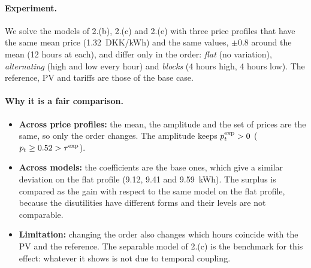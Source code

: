 \paragraph{Experiment.} We solve the models of 2.(b), 2.(c) and 2.(e) with three price profiles that have the same mean price (1.32~DKK/kWh) and the same values, $\pm 0.8$ around the
mean (12 hours at each), and differ only in the order: \emph{flat} (no variation), \emph{alternating} (high and low every hour) and \emph{blocks} (4 hours high, 4 hours low). The
reference, PV and tariffs are those of the base case.

\paragraph{Why it is a fair comparison.}
\begin{itemize}
    \item \textbf{Across price profiles:} the mean, the amplitude and the set of prices are the same, so only the order changes. The amplitude keeps $p^{\mathrm{exp}}_{t} > 0$ ($p_t \geq 0.52 > \tau^{\mathrm{exp}}$).
    \item \textbf{Across models:} the coefficients are the base ones, which give a similar deviation on the flat profile (9.12, 9.41 and 9.59~kWh). The surplus is compared as the
    gain with respect to the same model on the flat profile, because the disutilities have different forms and their levels are not comparable.
    \item \textbf{Limitation:} changing the order also changes which hours coincide with the PV and the reference. The separable model of 2.(c) is the benchmark for this effect: whatever it shows is not due to temporal coupling.
\end{itemize}

